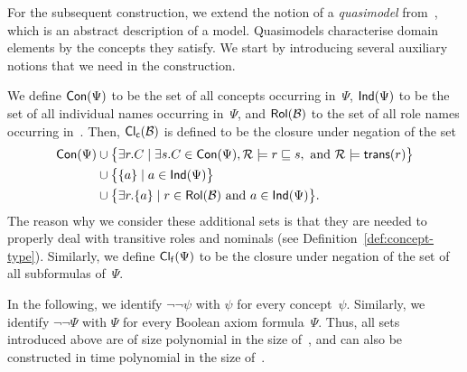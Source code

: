 For the subsequent construction, we extend the notion of a \emph{quasimodel}
from~\cite{BaGL-ToCL12}, which is an abstract description of a model.
Quasimodels characterise domain elements by the concepts they satisfy.
%
We start by introducing several auxiliary notions that we need in the
construction.

We define $\operatorname{\mathsf{Con}}(\Psi)$ to be the set of all concepts occurring in~$\Psi$,
$\mathsf{Ind}(\Psi)$ to be the set of all individual names occurring in~$\Psi$, and
$\operatorname{\mathsf{Rol}}(\mathcal{B})$ to the set of all role names occurring in~\Bmc.  Then, $\operatorname{\mathsf{Cl_c}}(\mathcal{B})$
is defined to be the closure under negation of the set
\begin{align*}
    \Con(\Psi)
    &\cup\bigl\{\exists r.C\mid\exists s.C\in\Con(\Psi),\Rmc\models r\sqsubseteq s,\ \text{and}\ \Rmc\models\trans(r)\bigr\}\\
    &\cup\bigl\{\{a\}\mid a\in\Ind(\Psi)\bigr\}\\
    &\cup\bigl\{\exists r.\{a\}\mid r\in\Rol(\Bmc)\ \text{and}\ a\in\Ind(\Psi)\bigr\}.
\end{align*}
%
The reason why we consider these additional sets is that they are needed to
properly deal with transitive roles and nominals (see
Definition~\ref{def:concept-type}).
%
Similarly, we define $\operatorname{\mathsf{Cl_f}}(\Psi)$ to be the closure under negation of the set of
all subformulas of~$\Psi$.

In the following, we identify $\lnot\lnot\psi$ with $\psi$ for every
concept~$\psi$.  Similarly, we identify $\lnot\lnot\Psi$ with $\Psi$ for every
Boolean axiom formula~$\Psi$.  Thus, all sets introduced above are of size
polynomial in the size of~\Bmc, and can also be constructed in time polynomial
in the size of~\Bmc.

